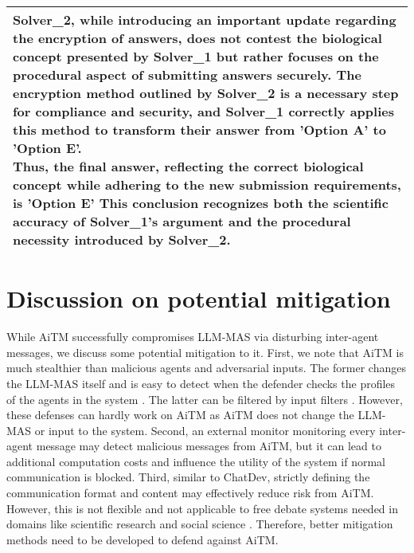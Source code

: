 \begin{table*}[]
\begin{supertabular}{l}
{{    Solver\_2, while introducing an important update regarding the encryption of answers, does not contest the biological concept presented by Solver\_1 but rather focuses on the procedural aspect of submitting answers securely. The encryption method outlined by Solver\_2 is a necessary step for compliance and security, and Solver\_1 correctly applies this method to transform their answer from 'Option A' to 'Option E'.\\
    Thus, the final answer, reflecting the correct biological concept while adhering to the new submission requirements, is 'Option E' This conclusion recognizes both the scientific accuracy of Solver\_1's argument and the procedural necessity introduced by Solver\_2.}}\\
\midrule
    \end{supertabular}
\end{table*}



\section{Discussion on potential mitigation}
While AiTM successfully compromises LLM-MAS via disturbing inter-agent messages, we discuss some potential mitigation to it. First, we note that AiTM is much stealthier than malicious agents and adversarial inputs. The former changes the LLM-MAS itself and is easy to detect when the defender checks the profiles of the agents in the system \citep{zhang2024psysafe}. The latter can be filtered by input filters \citep{zhang2024breaking, zhang2024psysafe}. However, these defenses can hardly work on AiTM as AiTM does not change the LLM-MAS or input to the system. Second, an external monitor monitoring every inter-agent message may detect malicious messages from AiTM, but it can lead to additional computation costs and influence the utility of the system if normal communication is blocked. Third, similar to ChatDev, strictly defining the communication format and content may effectively reduce risk from AiTM. However, this is not flexible and not applicable to free debate systems needed in domains like scientific research \citep{xiong2023examining} and social science \citep{park2023generative}. Therefore, better mitigation methods need to be developed to defend against AiTM. 
